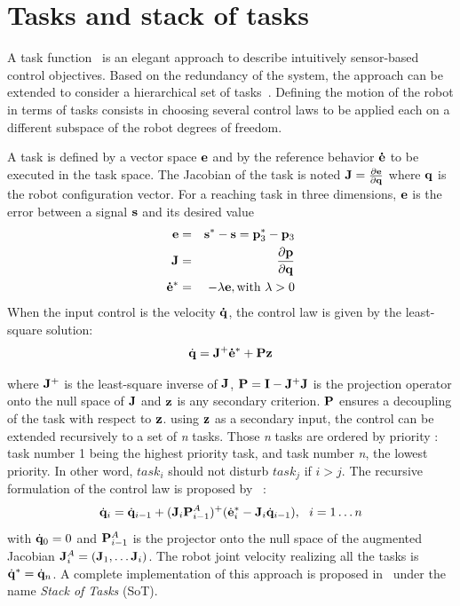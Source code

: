 \documentclass[letterpaper, 10pt, conference]{ieeeconf}      %
\begin{document}
\section{Tasks and stack of tasks}
\label{sec:sot}
A task function~\cite{samson91} is an elegant approach to describe intuitively
sensor-based control objectives. Based on the redundancy of the system, the
approach can be extended to consider a hierarchical set of
tasks~\cite{siciliano91}.  Defining the motion of the robot in terms of tasks
consists in choosing several control laws to be applied each on a different
subspace of the robot degrees of freedom. 

A task is defined by a vector space 
${\mathbf{e}}$ and by the reference behavior ${\mathbf{\dot{e}}}$ to be
executed in the task space. The Jacobian of the task is noted
${\mathbf{J}}=\frac{\partial{{\mathbf{e}}}}{\partial{{\mathbf{q}}}}$ where ${\mathbf{q}}$ is the robot
configuration vector. 
For a reaching task in three dimensions, ${\mathbf{e}}$ is the error 
between a signal ${\mathbf{s}}$ and its desired value
\begin{eqnarray*}
  {\mathbf{e}} & = & {\mathbf{s}}^* - {\mathbf{s}} = {\mathbf{p}}_3^* - {\mathbf{p}}_3\\
  {\mathbf{J}} & = & \frac{\partial{{\mathbf{p}}}}{\partial{{\mathbf{q}}}}\\
  {\mathbf{\dot{e}}}^* & = & -\lambda {\mathbf{e}}, \text{with } \lambda>0
\end{eqnarray*}
When the input control is the velocity
${\mathbf{\dot{q}}}$, the control law is given by the least-square solution:
\begin{equation}
\dot{{\mathbf{q}}} = {\mathbf{J}}^+ {\mathbf{\dot{e}}}^* + {\mathbf{P}}{\mathbf{z}}
\end{equation}

\noindent where ${\mathbf{J}}^+$ is the least-square inverse of ${\mathbf{J}}$,
${\mathbf{P}} = {\mathbf{I}} - {\mathbf{J}}^+ {\mathbf{J}}$ is the projection operator onto the null space
of ${\mathbf{J}}$ and ${\mathbf{z}}$ is any secondary criterion. ${\mathbf{P}}$ ensures
a decoupling of the task with respect to ${\mathbf{z}}$. 
using ${\mathbf{z}}$ as a secondary input, the control can be extended
recursively to a set of \emph{n} tasks. Those \emph{n} tasks
are ordered by priority : task number 1 being the highest priority task,
and task number \emph{n}, the lowest priority.
In other word, $task_i$ should not disturb $task_j$ if $i>j$.
The recursive formulation of the control law is proposed by~\cite{siciliano91} :
\begin{equation}
\dot{{\mathbf{q}}}_i = \dot{{\mathbf{q}}}_{i-1} + ({\mathbf{J}}_i {\mathbf{P}}_{i-1}^{A})^+
(\dot{{\mathbf{e}}}^*_i - {\mathbf{J}}_i \dot{{\mathbf{q}}}_{i-1}) , \ \ i = 1 \ldots n
\end{equation}
\noindent with $\dot{{\mathbf{q}}}_0 = 0$ and ${\mathbf{P}}_{i-1}^{A}$ is
the projector onto the null space of the augmented Jacobian
${\mathbf{J}}_i^A = ({\mathbf{J}}_1, \ldots {\mathbf{J}}_i)$. The robot
joint velocity realizing all the tasks is $\dot{{\mathbf{q}}}^* = \dot{{\mathbf{q}}}_n$.
A complete implementation of this approach is proposed in~\cite{mansard07} under the
name \emph{Stack of Tasks} (SoT). 
\end{document}
